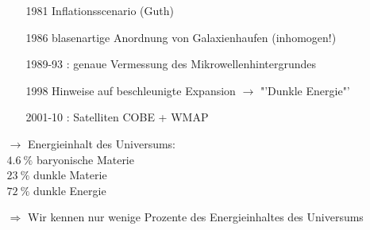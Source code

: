 \begin{itemize}
\begin{itemize}
\begin{itemize}
					\item[1981] Inflationsscenario (Guth)
					\item[1986] blasenartige Anordnung von Galaxienhaufen (inhomogen!)
					\item[1989-93]: genaue Vermessung des Mikrowellenhintergrundes
					\item[1998] Hinweise auf beschleunigte Expansion $\to$ "'Dunkle Energie"'
					\item[2001-10]: Satelliten COBE + WMAP
				\end{itemize}
			\item[$\to$] Energieinhalt des Universums:\\
				$\SI{4.6}{\%}$ baryonische Materie\\
				$\SI{23}{\%}$ dunkle Materie\\
				$\SI{72}{\%}$ dunkle Energie\\
			\item[$\Rightarrow$] Wir kennen nur wenige Prozente des Energieinhaltes des Universums
		\end{itemize}
\end{itemize}
